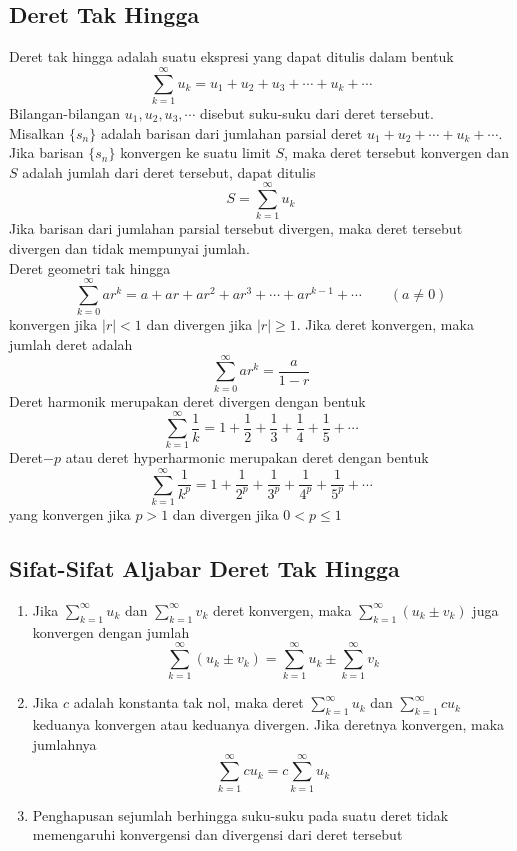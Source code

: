 \documentclass{article}
\begin{document}
\subsection{Deret Tak Hingga}
Deret tak hingga adalah suatu ekspresi yang dapat ditulis dalam bentuk 
$$ \sum_{k=1}^\infty u_k = u_1+u_2+u_3+\cdots+u_k+\cdots $$
Bilangan-bilangan $u_1,u_2,u_3,\cdots$ disebut suku-suku dari deret tersebut.\\
Misalkan $\{s_n\}$ adalah barisan dari jumlahan parsial deret $u_1+u_2+\cdots+u_k+\cdots$. Jika barisan $\{s_n\}$ konvergen ke suatu limit $S$, maka deret tersebut konvergen dan $S$ adalah jumlah dari deret tersebut, dapat ditulis 
$$ S=\sum_{k=1}^\infty u_k $$
Jika barisan dari jumlahan parsial tersebut divergen, maka deret tersebut divergen dan tidak mempunyai jumlah.\\
Deret geometri tak hingga 
$$ \sum_{k=0}^\infty ar^k = a+ar+ar^2+ar^3+\cdots + ar^{k-1}+\cdots \qquad (a\neq 0) $$
konvergen jika $|r|<1$ dan divergen jika $|r|\geq 1$. Jika deret konvergen, maka jumlah deret adalah 
$$ \sum_{k=0}^\infty ar^k =  \dfrac{a}{1-r} $$
Deret harmonik merupakan deret divergen dengan bentuk 
$$ \sum_{k=1}^\infty \dfrac{1}{k} = 1+\dfrac{1}{2}+\dfrac{1}{3}+\dfrac{1}{4}+\dfrac{1}{5}+\cdots  $$
Deret$-p$ atau deret hyperharmonic merupakan deret dengan bentuk 
$$ \sum_{k=1}^\infty \dfrac{1}{k^p} = 1+\dfrac{1}{2^p}+\dfrac{1}{3^p}+\dfrac{1}{4^p}+\dfrac{1}{5^p}+\cdots  $$
yang konvergen jika $p>1$ dan divergen jika $0<p\leq 1$
\subsection{Sifat-Sifat Aljabar Deret Tak Hingga}
\begin{enumerate}
	\item Jika $\displaystyle \sum_{k=1}^\infty u_k$ dan $\displaystyle \sum_{k=1}^\infty v_k$ deret konvergen, maka $\displaystyle \sum_{k=1}^\infty (u_k\pm v_k)$ juga konvergen dengan jumlah 
$$ \sum_{k=1}^\infty (u_k\pm v_k) = \sum_{k=1}^\infty u_k \pm \sum_{k=1}^\infty v_k $$
	\item Jika $c$ adalah konstanta tak nol, maka deret $\displaystyle \sum_{k=1}^\infty u_k$ dan $\displaystyle \sum_{k=1}^\infty cu_k$ keduanya konvergen atau keduanya divergen. Jika deretnya konvergen, maka jumlahnya
$$ \sum_{k=1}^\infty cu_k = c \sum_{k=1}^\infty u_k   $$
\item Penghapusan sejumlah berhingga suku-suku pada suatu deret tidak memengaruhi konvergensi dan divergensi dari deret tersebut
\end{enumerate}
\end{document}
